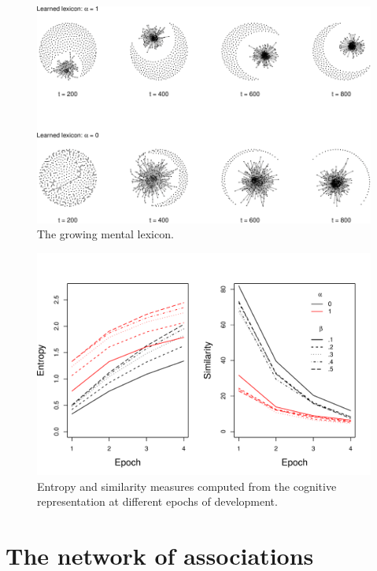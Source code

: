 \documentclass[
  man]{apa6}
\begin{document}
\begin{figure}
\centering
\includegraphics{Enrichment_files/figure-latex/fig2-1.pdf}
\caption{\label{fig:fig2}The growing mental lexicon.}
\end{figure}

\begin{figure}

{\centering \includegraphics[width=1\linewidth]{EntropySim} 

}

\caption{Entropy and similarity measures computed from the cognitive representation at different epochs of development.}\label{fig:unnamed-chunk-1}
\end{figure}

\hypertarget{the-network-of-associations}{%
\section{The network of associations}\label{the-network-of-associations}}
\end{document}
